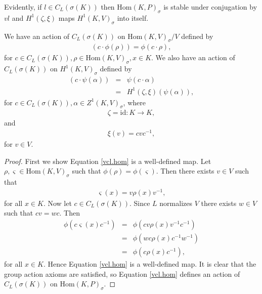 	Evidently, if $l \in C_L\left(\sigma(K)\right)$ then $\mathrm{Hom}(K, P)_\sigma$ is stable under conjugation by $vl$ and $H^1(\zeta, \xi)$ maps $H^1(K, V)_{\sigma}$ into itself.

	\begin{lemma} We have an action of $C_L(\sigma(K))$ on $\mathrm{Hom}(K, V)_\sigma / V$ defined by
		\begin{eqnarray} \label{vcl.hom}
			(c \cdot \phi(\rho)) = \phi\left(c \cdot \rho \right),
		\end{eqnarray}
		for $c \in C_L(\sigma(K)), \rho \in \mathrm{Hom}(K, V)_\sigma, x \in K$. We also have an action of $C_L(\sigma(K))$ on $H^1(K, V)_\sigma$ defined by
		\begin{eqnarray} \label{cl.h1}
			\left(c \cdot \psi(\alpha)\right)
			&=& \psi \left(c \cdot \alpha \right) \\
			&=& H^1(\zeta, \xi)\left(\psi(\alpha)\right), 
		\end{eqnarray}
		for $c \in C_L(\sigma(K)), \alpha \in Z^1(K, V)_\sigma$, where
		\begin{eqnarray*}
		\zeta = \mathrm{id}: K \rightarrow K,
	\end{eqnarray*}
	and 
	\begin{eqnarray*}
		\xi(v) = cvc^{-1},
	\end{eqnarray*}
	for $v \in V$.
	\end{lemma}
\begin{proof}
	First we show Equation \ref{vcl.hom} is a well-defined map. Let $\rho, \varsigma \in \mathrm{Hom}(K, V)_\sigma$ such that $\phi(\rho) = \phi(\varsigma)$. Then there exists $v \in V$ such that
	\begin{eqnarray*} \varsigma(x) = v\rho(x)v^{-1}, \end{eqnarray*}
		for all $x \in K$. Now let $c \in C_L(\sigma(K))$. Since $L$ normalizes $V$ there exists $w \in V$ such that $cv = wc$. Then
		\begin{eqnarray*}
			\phi \left(c \varsigma(x)c^{-1}\right) 
			&=& \phi \left(cv \rho(x) v^{-1}c^{-1}\right) \\
			&=& \phi \left(wc \rho(x) c^{-1}w^{-1}\right) \\
			&=& \phi \left(c \rho(x) c^{-1}\right),
		\end{eqnarray*}
		for all $x \in K$. Hence Equation \ref{vcl.hom} is a well-defined map. It is clear that the group action axioms are satisfied, so Equation \ref{vcl.hom} defines an action of $C_L(\sigma(K))$ on $\mathrm{Hom}(K, P)_\sigma$.


\end{proof}
